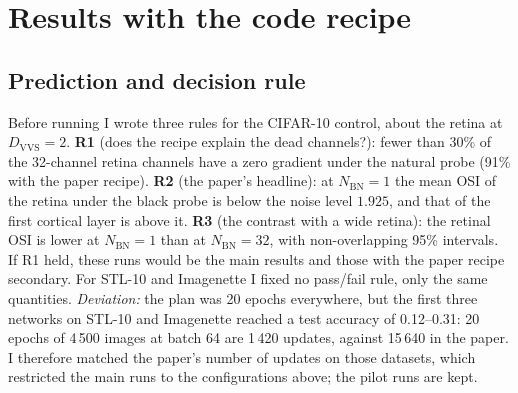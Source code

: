\documentclass[11pt,a4paper]{article}
\newcommand{\NBN}{N_{\mathrm{BN}}}
\newcommand{\DVVS}{D_{\mathrm{VVS}}}
\begin{document}
\section{Results with the code recipe}\label{sec:res}
\subsection{Prediction and decision rule}\label{sec:off}
Before running I wrote three rules for the CIFAR-10 control, about the retina at $\DVVS=2$. \textbf{R1} (does the recipe explain the dead channels?): fewer than 30\% of the 32-channel retina channels have a zero gradient under the natural probe (91\% with the paper recipe). \textbf{R2} (the paper's headline): at $\NBN=1$ the mean OSI of the retina under the black probe is below the noise level $1.925$, and that of the first cortical layer is above it. \textbf{R3} (the contrast with a wide retina): the retinal OSI is lower at $\NBN=1$ than at $\NBN=32$, with non-overlapping 95\% intervals. If R1 held, these runs would be the main results and those with the paper recipe secondary. For STL-10 and Imagenette I fixed no pass/fail rule, only the same quantities. \emph{Deviation:} the plan was 20 epochs everywhere, but the first three networks on STL-10 and Imagenette reached a test accuracy of 0.12--0.31: 20 epochs of 4\,500 images at batch 64 are 1\,420 updates, against 15\,640 in the paper. I therefore matched the paper's number of updates on those datasets, which restricted the main runs to the configurations above; the pilot runs are kept.

\begin{table}[t]\centering\footnotesize
\setlength{\tabcolsep}{4pt}

\caption{Code recipe, 3 seeds per row. Retinal and first-cortical-layer OSI: mean $\pm$ 95\% interval over channels, with the number of non-zero RFs out of the channels in brackets; the natural probe has no zero RFs except one. C-S / or.: retinal channels labelled center-surround / oriented (natural probe). Paper ($\NBN=1$, $\DVVS=2$): retina $1.56\pm0.22$, first cortical layer $3.05\pm0.30$; noise $1.925$ (ported OSI).}\label{tab:off}
\end{table}
\end{document}
